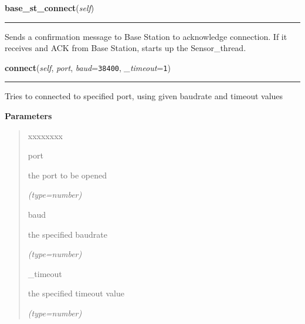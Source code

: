     \vspace{0.5ex}

\hspace{.8\funcindent}\begin{boxedminipage}{\funcwidth}

    \raggedright \textbf{base\_st\_connect}(\textit{self})

    \vspace{-1.5ex}

    \rule{\textwidth}{0.5\fboxrule}
\setlength{\parskip}{2ex}
    Sends a confirmation message to Base Station to acknowledge connection.
    If it receives and ACK from Base Station, starts up the Sensor\_thread.

\setlength{\parskip}{1ex}
    \end{boxedminipage}

    \label{Serial_conn:Serial_conn:connect}

    \vspace{0.5ex}

\hspace{.8\funcindent}\begin{boxedminipage}{\funcwidth}

    \raggedright \textbf{connect}(\textit{self}, \textit{port}, \textit{baud}={\tt 38400}, \textit{\_timeout}={\tt 1})

    \vspace{-1.5ex}

    \rule{\textwidth}{0.5\fboxrule}
\setlength{\parskip}{2ex}
    Tries to connected to specified port, using given baudrate and timeout 
    values

\setlength{\parskip}{1ex}
      \textbf{Parameters}
      \vspace{-1ex}

      \begin{quote}
        \begin{Ventry}{xxxxxxxx}

          \item[port]

          the port to be opened

            {\it (type=number)}

          \item[baud]

          the specified baudrate

            {\it (type=number)}

          \item[\_timeout]

          the specified timeout value

            {\it (type=number)}

        \end{Ventry}

      \end{quote}

    \end{boxedminipage}

